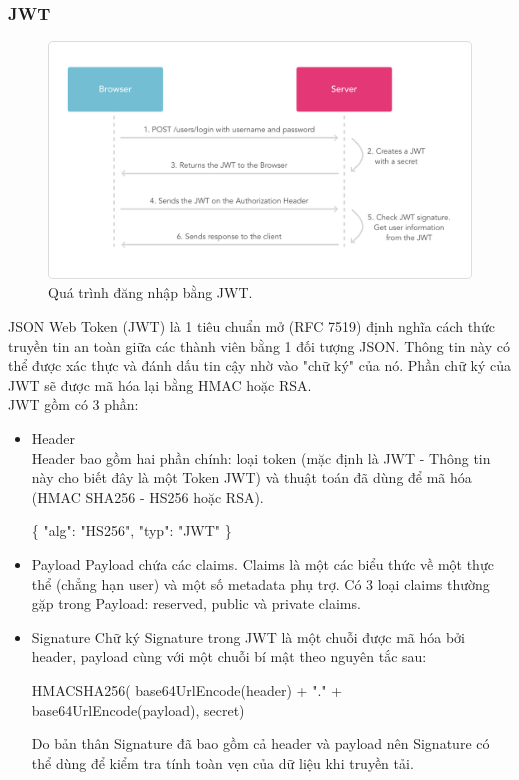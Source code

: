 \documentclass[a4paper,12pt,oneside]{article}
\begin{document}
\subsubsection{JWT}
\begin{center}
\begin{figure}[htp]
\begin{center}
\includegraphics[scale=.35]{hinh/jwt2.png}
\end{center}
\caption{Quá trình đăng nhập bằng JWT.}
\end{figure}
\end{center}
\noindent JSON Web Token (JWT) là 1 tiêu chuẩn mở (RFC 7519) định nghĩa cách thức truyền tin an toàn giữa các thành viên bằng 1 đối tượng JSON. Thông tin này có thể được xác thực và đánh dấu tin cậy nhờ vào "chữ ký" của nó. Phần chữ ký của JWT sẽ được mã hóa lại bằng HMAC hoặc RSA.\\
JWT gồm có 3 phần: 
\begin{itemize}
\item Header\\
Header bao gồm hai phần chính: loại token (mặc định là JWT - Thông tin này cho biết đây là một Token JWT) và thuật toán đã dùng để mã hóa (HMAC SHA256 - HS256 hoặc RSA). \\

\begin{center}
\{ "alg": "HS256", "typ": "JWT" \} 
\end{center}

\item Payload 
Payload chứa các claims. Claims là một các biểu thức về một thực thể (chẳng hạn user) và một số metadata phụ trợ. Có 3 loại claims thường gặp trong Payload: reserved, public và private claims. 
\item Signature 
Chữ ký Signature trong JWT là một chuỗi được mã hóa bởi header, payload cùng với một chuỗi bí mật theo nguyên tắc sau: 
\begin{center}
HMACSHA256(  base64UrlEncode(header) + "." +  base64UrlEncode(payload),  secret) 
\end{center}
Do bản thân Signature đã bao gồm cả header và payload nên Signature có thể dùng để kiểm tra tính toàn vẹn của dữ liệu khi truyền tải. 
 
\end{itemize}
\end{document}
